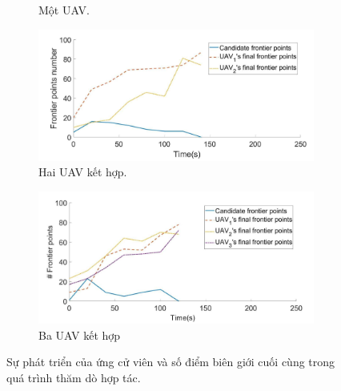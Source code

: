 \documentclass[11pt,openany]{book}
\begin{document}
\begin{algorimth}[H]
\begin{figure}[H]
\begin{subfigure}[H]{0.7\linewidth}
        \caption{{Một UAV.}}
        \label{fig:3.15a}
    \end{subfigure}
    \begin{subfigure}[H]{0.7\linewidth}
        \includegraphics[chiều rộng=\linewidth]{assets/3_15_b.png}
        \caption{{Hai UAV kết hợp.}}
        \label{fig:3.15b}
    \end{subfigure}
    \begin{subfigure}[H]{0.7\linewidth}
        \includegraphics[chiều rộng=\linewidth]{assets/3_15_c.png}
        \caption{{Ba UAV kết hợp}}
        \label{fig:3.15c}
    \end{subfigure}
    \caption{Sự phát triển của ứng cử viên và số điểm biên giới cuối cùng trong quá trình thăm dò hợp tác.}
    \label{fig:3.15}
\end{figure}
\begin{figure}[H]
    \centering
    \begin{subfigure}[H]{0.5\linewidth}

\end{subfigure}
\end{figure}
\end{algorimth}
\end{document}
